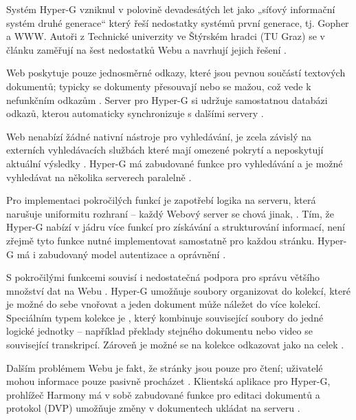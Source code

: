 Systém Hyper-G vzniknul v polovině devadesátých let jako „síťový informační systém druhé generace“ který řeší nedostatky systémů první generace, tj. Gopher a WWW. Autoři z Technické univerzity ve Štýrském hradci (TU Graz) se v článku  zaměřují na šest nedostatků Webu a navrhují jejich řešení \autocite{Andrews1995}.

Web poskytuje pouze jednosměrné odkazy, které jsou pevnou součástí textových dokumentů; typicky se dokumenty přesouvají nebo se mažou, což vede k nefunkčním odkazům \autocite[207]{Andrews1995}. Server pro Hyper-G si udržuje samostatnou databázi odkazů, kterou automaticky synchronizuje s dalšími servery \autocites[208]{Andrews1995}[35]{Muller-Prove2002}. 

Web nenabízí žádné nativní nástroje pro vyhledávání, je zcela závislý na externích vyhledávacích službách které mají omezené pokrytí a neposkytují aktuální výsledky \autocite[207]{Andrews1995}. Hyper-G má zabudované funkce pro vyhledávání a je možné vyhledávat na několika serverech paralelně \autocites[208]{Andrews1995}.

Pro implementaci pokročilých funkcí je zapotřebí logika na serveru, která narušuje uniformitu rozhraní -- každý Webový server se chová jinak, . Tím, že Hyper-G nabízí v jádru více funkcí pro získávání a strukturování informací, není zřejmě tyto funkce nutné implementovat samostatně pro každou stránku. Hyper-G má i zabudovaný model autentizace a oprávnění \autocite[208]{Andrews1995}.

\label{p:hyperg:collection}
S pokročilými funkcemi souvisí i nedostatečná podpora pro správu většího množství dat na Webu \autocite[207]{Andrews1995}. Hyper-G umožňuje soubory organizovat do kolekcí, které je možné do sebe vnořovat a jeden dokument může náležet do více kolekcí. Speciálním typem kolekce je , který kombinuje související soubory do jedné logické jednotky -- například překlady stejného dokumentu nebo video se související transkripcí. Zároveň je možné se na kolekce odkazovat jako na celek \autocite[36]{Muller-Prove2002}.

Dalším problémem Webu je fakt, že stránky jsou pouze pro čtení; uživatelé mohou informace pouze pasivně procházet \autocite[207]{Andrews1995}. Klientská aplikace pro Hyper-G, prohlížeč Harmony má v sobě zabudované funkce pro editaci dokumentů a protokol  (DVP) umožňuje změny v dokumentech ukládat na serveru \autocite[212]{Andrews1995}.

